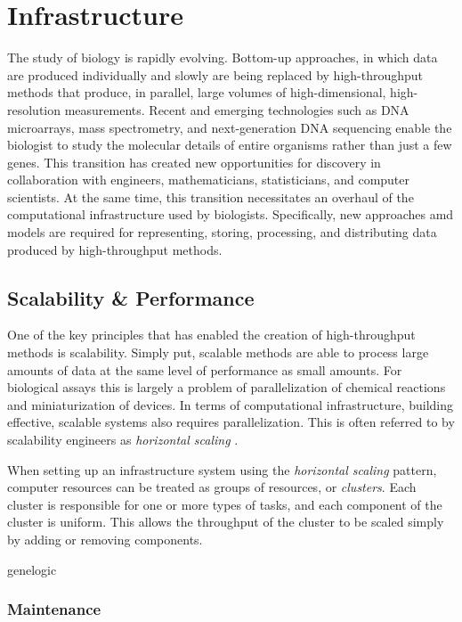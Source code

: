 \section{Infrastructure}
\label{Infrastructure}
The study of biology is rapidly evolving.  Bottom-up approaches, in which data
are produced individually and slowly are being replaced by high-throughput
methods that produce, in parallel, large volumes of high-dimensional,
high-resolution measurements.  Recent and emerging technologies such as DNA
microarrays, mass spectrometry, and next-generation DNA sequencing enable the
biologist to study the molecular details of entire organisms rather than just a
few genes.  This transition has created new opportunities for discovery in
collaboration with engineers, mathematicians, statisticians, and computer
scientists.  At the same time, this transition necessitates an overhaul of the
computational infrastructure used by biologists.  Specifically, new approaches amd
models are required for representing, storing, processing, and distributing
data produced by high-throughput methods.

\subsection{Scalability \& Performance}
\label{Scalability}

One of the key principles that has enabled the creation of high-throughput
methods is scalability.  Simply put, scalable methods are able to process large
amounts of data at the same level of performance as small amounts.  For
biological assays this is largely a problem of parallelization of chemical
reactions and miniaturization of devices.  In terms of computational
infrastructure, building effective, scalable systems also requires
parallelization.  This is often referred to by scalability engineers as
\emph{horizontal scaling} \cite{schlossnagle2006,arlitt2001}.

When setting up an infrastructure system using the \emph{horizontal scaling}
pattern, computer resources can be treated as groups of resources, or
\emph{clusters}.  Each cluster is responsible for one or more types of tasks,
and each component of the cluster is uniform.  This allows the throughput of
the cluster to be scaled simply by adding or removing components.

genelogic		\cite{PMID_17059591}

\subsubsection{Maintenance}

